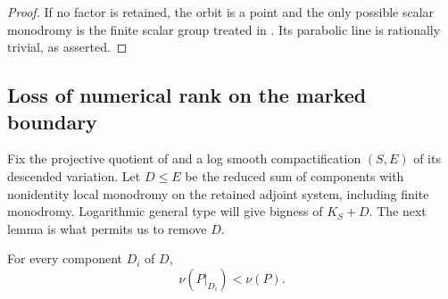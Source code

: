 \begin{proof}
If no factor is retained, the orbit is a point and the only possible
scalar monodromy is the finite scalar group treated in
.  Its parabolic line is rationally
trivial, as asserted.
\end{proof}

\subsection{Loss of numerical rank on the marked boundary}

Fix the projective quotient of  and a log smooth
compactification $(S,E)$ of its descended variation.  Let $D\leq E$
be the reduced sum of components with nonidentity local monodromy
on the retained adjoint system, including finite monodromy.
Logarithmic general type will give bigness of $K_S+D$.  The next
lemma is what permits us to remove $D$.

\begin{lemma}
\label{period:rankloss}
For every component $D_i$ of $D$,
\begin{equation}
\label{period:strictdrop}
                       \nu(P|_{D_i})<\nu(P).
\end{equation}
\end{lemma}

